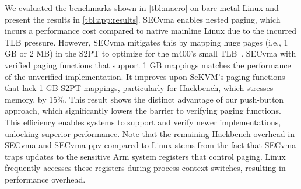 We evaluated the benchmarks shown in \autoref{tbl:macro} on bare-metal Linux and present the results in \autoref{tbl:app:results}. SECvma enables nested paging, which incurs a performance cost compared to native mainline Linux due to the incurred TLB pressure. However, SECvma mitigates this by mapping huge pages (i.e., 1 GB or 2 MB) in the S2PT to optimize for the m400’s small TLB~\cite{taososp21}. SECvma with verified paging functions that support 1 GB mappings matches the performance of the unverified implementation. It improves upon SeKVM's paging functions that lack 1 GB S2PT mappings, particularly for Hackbench, which stresses memory, by 15\%. This result shows the distinct advantage of our push-button approach, which significantly lowers the barrier to verifying paging functions. This efficiency enables systems to support and verify newer implementations, unlocking superior performance. Note that the remaining Hackbench overhead in SECvma and SECvma-ppv compared to Linux stems from the fact that SECvma traps updates to the sensitive Arm system registers that control paging. Linux frequently accesses these registers during process context switches, resulting in performance overhead. %



